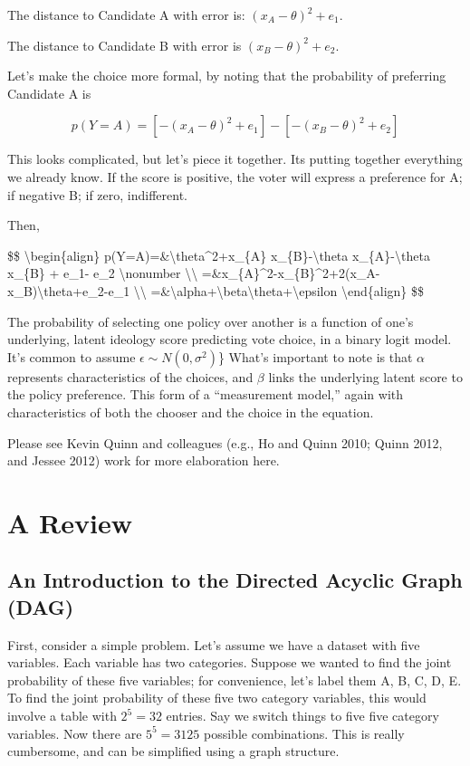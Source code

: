 \documentclass[
]{book}
\begin{document}
The distance to Candidate A with error is: \((x_{A}-\theta)^2+e_1\).

The distance to Candidate B with error is \((x_{B}-\theta)^2+e_2\).

Let's make the choice more formal, by noting that the probability of preferring Candidate A is

\[ p(Y=A)=[-(x_{A}-{\theta})^2+e_1] - [-(x_{B}-{\theta})^2+e_2] \]

This looks complicated, but let's piece it together. Its putting together everything we already know. If the score is positive, the voter will express a preference for A; if negative B; if zero, indifferent.

Then,

\$\$ \textbackslash begin\{align\} p(Y=A)=\&\textbackslash theta\^{}2+x\_\{A\} x\_\{B\}-\textbackslash theta x\_\{A\}-\textbackslash theta x\_\{B\} + e\_1- e\_2 \textbackslash nonumber \textbackslash\textbackslash{} =\&x\_\{A\}\^{}2-x\_\{B\}\^{}2+2(x\_A-x\_B)\textbackslash theta+e\_2-e\_1 \textbackslash\textbackslash{} =\&\textbackslash alpha+\textbackslash beta\textbackslash theta+\textbackslash epsilon \textbackslash end\{align\} \$\$

The probability of selecting one policy over another is a function of one's underlying, latent ideology score predicting vote choice, in a binary logit model. It's common to assume \(\epsilon \sim N(0, \sigma^2)\)\} What's important to note is that \(\alpha\) represents characteristics of the choices, and \(\beta\) links the underlying latent score to the policy preference. This form of a ``measurement model,'' again with characteristics of both the chooser and the choice in the equation.

Please see Kevin Quinn and colleagues (e.g., Ho and Quinn 2010; Quinn 2012, and Jessee 2012) work for more elaboration here.

\section{A Review}\label{a-review}

\subsection*{An Introduction to the Directed Acyclic Graph (DAG)}\label{an-introduction-to-the-directed-acyclic-graph-dag}

First, consider a simple problem. Let's assume we have a dataset with five variables. Each variable has two categories. Suppose we wanted to find the joint probability of these five variables; for convenience, let's label them A, B, C, D, E. To find the joint probability of these five two category variables, this would involve a table with \(2^5=32\) entries. Say we switch things to five five category variables. Now there are \(5^5=3125\) possible combinations. This is really cumbersome, and can be simplified using a graph structure.
\end{document}
